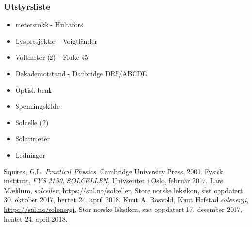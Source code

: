 \documentclass[%
 reprint,
 amsmath,amssymb,
 aps,
 norsk,
 booktabs
]{revtex4-1}
\begin{document}
\subsubsection*{Utstyrsliste}
\begin{itemize}
\label{utstyr}
\item meterstokk - Hultafors
\item Lysprosjektor - Voigtländer
\item Voltmeter (2) - Fluke 45
\item Dekademotstand - Danbridge DR5/ABCDE
\item Optisk benk
\item Spenningskilde
\item Solcelle (2)
\item Solarimeter
\item Ledninger
\end{itemize}
\begin{thebibliography}{9}
Squires, G.L. \emph{Practical Physics}, Cambridge University Press, 2001.
Fysisk institutt, \emph{FYS 2150. SOLCELLEN}, Univseritet i Oslo, februar 2017.
Lars Mæhlum, \emph{solceller}, \url{https://snl.no/solceller}, Store norske leksikon, sist oppdatert 30. oktober 2017, hentet 24. april 2018.
Knut A. Rosvold, Knut Hofstad \emph{solenergi}, \url{https://snl.no/solenergi}, Stor norske leksikon, sist oppdatert 17. desember 2017, hentet 24. april 2018.
\end{thebibliography}
\end{document}
